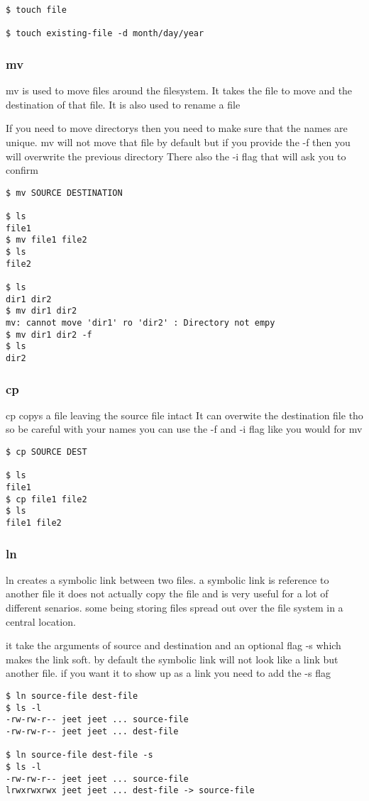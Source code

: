 \documentclass[a4paper]{article}
\begin{document}
\begin{verbatim}
$ touch file

$ touch existing-file -d month/day/year
\end{verbatim}

\subsubsection*{mv}
\label{sec:org147eb5c}
\begin{notes}
	mv is used to move files around the filesystem. It takes the file to move and
	the destination of that file. It is also used to rename a file

	If you need to move directorys then you need to make sure that the names are
	unique. mv will not move that file by default but if you provide the -f then you
	will overwrite the previous directory
	There also the -i flag that will ask you to confirm
\end{notes}

\begin{verbatim}
$ mv SOURCE DESTINATION

$ ls
file1
$ mv file1 file2
$ ls
file2

$ ls
dir1 dir2
$ mv dir1 dir2
mv: cannot move 'dir1' ro 'dir2' : Directory not empy
$ mv dir1 dir2 -f
$ ls
dir2
\end{verbatim}
\subsubsection*{cp}
\label{sec:orgee3f4c1}
\begin{notes}
	cp copys a file leaving the source file intact It can overwite the destination
	file tho so be careful with your names you can use the -f and -i flag like you
	would for mv
\end{notes}

\begin{verbatim}
$ cp SOURCE DEST

$ ls
file1
$ cp file1 file2
$ ls
file1 file2
\end{verbatim}
\subsubsection*{ln}
\label{sec:org3883214}
\begin{notes}
	ln creates a symbolic link between two files. a symbolic link is reference to
	another file it does not actually copy the file and is very useful for a lot of
	different senarios. some being storing files spread out over the file system in
	a central location.

	it take the arguments of source and destination and an optional flag -s which
	makes the link soft. by default the symbolic link will not look like a link but
	another file. if you want it to show up as a link you need to add the -s flag
\end{notes}
\begin{verbatim}
$ ln source-file dest-file
$ ls -l
-rw-rw-r-- jeet jeet ... source-file
-rw-rw-r-- jeet jeet ... dest-file

$ ln source-file dest-file -s
$ ls -l
-rw-rw-r-- jeet jeet ... source-file
lrwxrwxrwx jeet jeet ... dest-file -> source-file
\end{verbatim}
\end{document}

